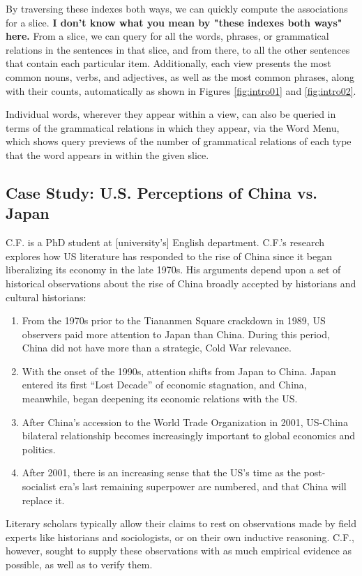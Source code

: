 \documentclass{sig-alternate}
\newcommand{\strong}[1] {\textbf{#1}}
\begin{document}
By traversing these indexes both ways, we can quickly compute the associations for a slice. \strong{I don't know what you mean by "these indexes both ways" here.}  From a slice, we can query for all the words, phrases, or grammatical relations in the sentences in that slice, and from there, to all the other sentences that contain each particular item.  Additionally, each view presents the most common nouns, verbs, and adjectives, as well as the most common phrases, along with their counts, automatically as shown in Figures \ref{fig:intro01} and \ref{fig:intro02}.    

Individual words, wherever they appear within a view, can also be queried in terms of the grammatical relations in which they appear, via the Word Menu, which shows query previews of the number of grammatical relations of each type that the word appears in within the given slice.



\subsection{Case Study: U.S. Perceptions of China vs. Japan}

C.F. is a PhD student at [university's] English department. C.F.'s research explores how US literature has responded to the rise of China since it began liberalizing its economy in the late 1970s.  His arguments depend upon a set of historical observations about the rise of China  broadly accepted by historians and cultural historians: 
\begin{enumerate}
\item From the 1970s prior to the Tiananmen Square crackdown in 1989, US observers paid more attention to Japan than China. During this period, China did not have  more than a strategic, Cold War relevance. 
\item With the onset of the 1990s, attention shifts from Japan to China. Japan entered its first ``Lost Decade'' of economic stagnation, and China, meanwhile, began deepening its economic relations with the US.
\item After China's accession to the World Trade Organization in 2001, US-China bilateral relationship becomes increasingly important to global economics and politics.
\item After 2001, there is an increasing sense that the US's time as the post-socialist era's last remaining superpower are numbered, and that China will replace it.
\end{enumerate}
Literary scholars typically allow their claims to rest on observations made by field experts like historians and sociologists, or on their own inductive reasoning. C.F., however, sought to supply these observations with as much empirical evidence as possible, as well as to verify them.
\end{document}
